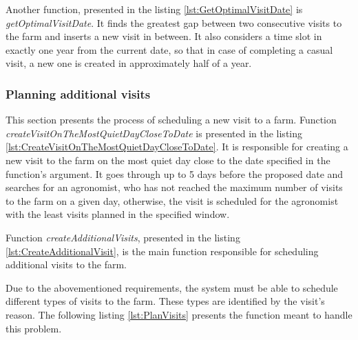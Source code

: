 Another function, presented in the listing \ref{lst:GetOptimalVisitDate} is \textit{getOptimalVisitDate}. It finds the greatest gap between two consecutive visits to the farm and inserts a new visit in between. It also considers a time slot in exactly one year from the current date, so that in case of completing a casual visit, a new one is created in approximately half of a year.



\subsubsection*{Planning additional visits}

This section presents the process of scheduling a new visit to a farm. Function \textit{createVisitOnTheMostQuietDayCloseToDate} is presented in the listing \ref{lst:CreateVisitOnTheMostQuietDayCloseToDate}. It is responsible for creating a new visit to the farm on the most quiet day close to the date specified in the function's argument. It goes through up to 5 days before the proposed date and searches for an agronomist, who has not reached the maximum number of visits to the farm on a given day, otherwise, the visit is scheduled for the agronomist with the least visits planned in the specified window.



Function \textit{createAdditionalVisits}, presented in the listing \ref{lst:CreateAdditionalVisit}, is the main function responsible for scheduling additional visits to the farm.



Due to the abovementioned requirements, the system must be able to schedule different types of visits to the farm. These types are identified by the visit's reason. The following listing \ref{lst:PlanVisits} presents the function meant to handle this problem.




